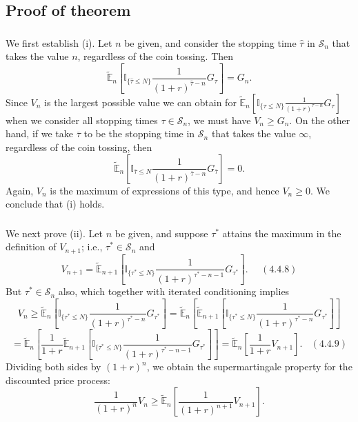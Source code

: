 \documentclass[c, dvipsnames, 8pt]{beamer}
\begin{document}
\begin{frame}[shrink=5]

\subsection{Proof of theorem}

\frametitle{\insertsection} 
\framesubtitle{\insertsubsection} 

%
We first establish (i). Let $n$ be given, and consider the stopping time $\widehat{\tau}$ in $\mathcal{S}_n$ that takes the value $n$, regardless of the coin tossing. Then
\begin{equation}\label{key}
\widetilde{\mathbb{E}}_n\left[\mathbb{I}_{\{\widehat{\tau}\le N\}}\frac{1}{(1+r)^{\widehat{\tau}-n}}G_{\tau}\right]=G_n.
\end{equation}
Since $V_n$ is the largest possible value we can obtain for $\widetilde{\mathbb{E}}_n\left[\mathbb{I}_{\{\tau\le N\}}\frac{1}{(1+r)^{\tau-n}}G_{\tau}\right]$ when we consider all stopping times $\tau\in \mathcal{S}_n$, we must have $V_n \ge G_n$. On the other hand, if we take $\overline{\tau}$ to be the stopping time in $\mathcal{S}_n$ that takes the value $\infty$, regardless of the coin tossing, then 
\begin{equation}\label{key}
\widetilde{\mathbb{E}}_n\left[\mathbb{I}_{\overline{\tau}\le N}\frac{1}{(1+r)^{\overline{\tau}-n}}G_{\overline{\tau}}\right]=0.
\end{equation}
Again, $V_n$ is the maximum of expressions of this type, and hence $V_n \ge 0$. We conclude that (i) holds.
\end{frame}

\begin{frame}[shrink=5]

\frametitle{\insertsection} 
\framesubtitle{\insertsubsection} 
We next prove (ii). Let $n$ be given, and suppose $\tau^*$ attains the maximum 
in the definition of $V_{n+1}$; i.e., $\tau^*\in\mathcal{S}_n$ and
$$V_{n+1}=\widetilde{\mathbb{E}}_{n+1}\left[\mathbb{I}_{\{\tau^*\le N\}}\frac{1}{(1+r)^{\tau^*-n-1}}G_{\tau^*}\right]. \ \ \ \ \ \  (4.4.8)$$
But $\tau^*\in\mathcal{S}_n$ also, which together with iterated conditioning implies
$$V_{n}\ge\widetilde{\mathbb{E}}_{n}\left[\mathbb{I}_{\{\tau^*\le N\}}\frac{1}{(1+r)^{\tau^*-n}}G_{\tau^*}\right]=\widetilde{\mathbb{E}}_{n}\left[\widetilde{\mathbb{E}}_{n+1}\left[\mathbb{I}_{\{\tau^*\le N\}}\frac{1}{(1+r)^{\tau^*-n}}G_{\tau^*}\right]\right]$$
$$=\widetilde{\mathbb{E}}_{n}\left[\frac{1}{1+r}\widetilde{\mathbb{E}}_{n+1}\left[\mathbb{I}_{\{\tau^*\le N\}}\frac{1}{(1+r)^{\tau^*-n-1}}G_{\tau^*}\right]\right]=\widetilde{\mathbb{E}}_{n}\left[\frac{1}{1+r}V_{n+1}\right]. \ \ \ \ (4.4.9)$$
Dividing both sides by $(1+r)^n$, we obtain the supermartingale property for the discounted price process:
\begin{equation}\label{key}
\frac{1}{(1+r)^n}V_n\ge \widetilde{\mathbb{E}}_{n}\left[\frac{1}{(1+r)^{n+1}}V_{n+1}\right].
\end{equation}\end{frame}
\end{document}
